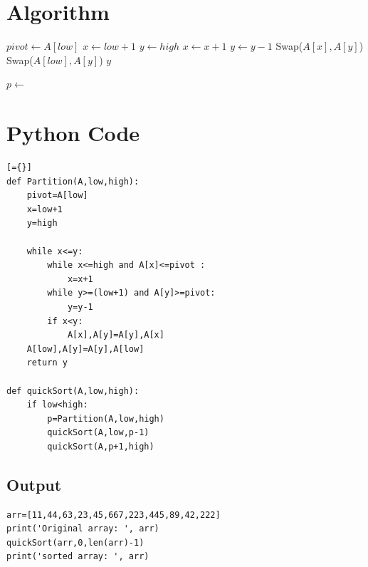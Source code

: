 \documentclass{article}
\begin{document}
{\section*{Algorithm}
\begin{algorithm}
\caption{Quick Sort}
\begin{algorithmic}[1]

    \State $pivot \gets A[low]$
    \State $x \gets low + 1$
    \State $y \gets high$
            \State $x \gets x + 1$
        \EndWhile
            \State $y \gets y - 1$
        \EndWhile
            \State Swap($A[x],A[y]$)
        \EndIf
    \EndWhile
    \State Swap($A[low],A[y]$)
    \State \Return $y$
\EndProcedure

        \State $p \gets$ 
        \State {}
        \State {}
    \EndIf
\EndProcedure

\end{algorithmic}
\end{algorithm}

\section*{Python Code}
\begin{lstlisting}[={}]
def Partition(A,low,high):
    pivot=A[low]
    x=low+1
    y=high

    while x<=y:
        while x<=high and A[x]<=pivot :
            x=x+1
        while y>=(low+1) and A[y]>=pivot:
            y=y-1
        if x<y:
            A[x],A[y]=A[y],A[x]
    A[low],A[y]=A[y],A[low]
    return y

def quickSort(A,low,high):
    if low<high:
        p=Partition(A,low,high)
        quickSort(A,low,p-1)
        quickSort(A,p+1,high)
\end{lstlisting}

\subsection*{Output}
\begin{lstlisting}
arr=[11,44,63,23,45,667,223,445,89,42,222]
print('Original array: ', arr)
quickSort(arr,0,len(arr)-1)
print('sorted array: ', arr)


\end{lstlisting}}
\end{document}
